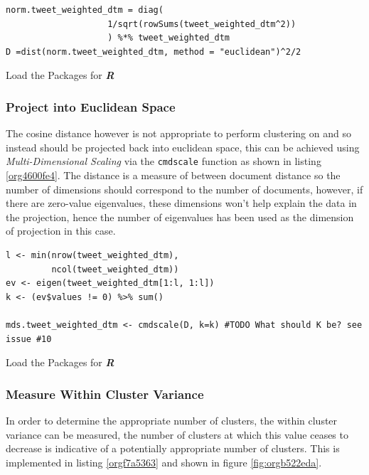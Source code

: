 \documentclass[11pt]{article}
\begin{document}
\begin{listing}[htbp]
\begin{verbatim}
norm.tweet_weighted_dtm = diag(
                    1/sqrt(rowSums(tweet_weighted_dtm^2))
                    ) %*% tweet_weighted_dtm
D =dist(norm.tweet_weighted_dtm, method = "euclidean")^2/2
\end{verbatim}
\caption{\label{org900c05c}Load the Packages for \textbf{\textbf{\emph{R}}}}
\end{listing}

\subsubsection{Project into Euclidean Space}
\label{sec:org16fa9ca}
The cosine distance however is not appropriate to perform clustering on and so instead should be projected back into euclidean space, this can be achieved using \emph{Multi-Dimensional Scaling} via the \texttt{cmdscale} function as shown in listing \ref{org4600fe4}. The distance is a measure of between document distance so the number of dimensions should correspond to the number of documents, however, if there are zero-value eigenvalues, these dimensions won't help explain the data in the projection, hence the number of eigenvalues has been used as the dimension of projection in this case.

\begin{listing}[htbp]
\begin{verbatim}
l <- min(nrow(tweet_weighted_dtm),
         ncol(tweet_weighted_dtm))
ev <- eigen(tweet_weighted_dtm[1:l, 1:l])
k <- (ev$values != 0) %>% sum()

mds.tweet_weighted_dtm <- cmdscale(D, k=k) #TODO What should K be? see issue #10
\end{verbatim}
\caption{\label{org4600fe4}Load the Packages for \textbf{\textbf{\emph{R}}}}
\end{listing}

\subsubsection{Measure Within Cluster Variance}
\label{sec:org652d47b}
In order to determine the appropriate number of clusters, the within cluster
variance can be measured, the number of clusters at which this value ceases to
decrease is indicative of a potentially appropriate number of clusters. This is
implemented in listing \ref{orgf7a5363} and shown in figure \ref{fig:orgb522eda}.
\end{document}
